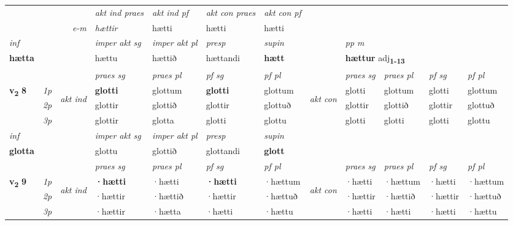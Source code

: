 \begin{longtable}[l]{X>{\footnotesize\itshape}llXXXXlXXXX}
   && &  \textit{akt ind praes} & \textit{akt ind pf} & \textit{akt con praes} & \textit{akt con pf} \\*
\multicolumn{3}{r}{\textit{e-m}} & hættir & hætti & hætti & hætti \\*

\cmidrule{4-7}
   {\textit{inf}} & &  & \textit{imper akt sg} & \textit{imper akt pl}   & \textit{presp} & \textit{supin}  && \textit{pp m} \\*
  {\textbf{hætta}} & && hættu  & hættið   & hættandi &  \textbf{hætt}  && \multicolumn{2}{l}{\textbf{hættur} adj\textbf{\textsubscript{1-13}}} \\*

\midrule

 & &   & \textit{praes sg}  & \textit{praes pl}    & \textit{ pf sg} & \textit{pf pl} & & \textit{praes sg}  & \textit{praes pl}    & \textit{pf sg} & \textit{pf pl }  \\ \cmidrule{4-7} \cmidrule{9-12}
 \multirow{2}{*}{{{\textbf{v{\textsubscript{2}}} \Large{\textbf{8}}}}}  & 1p & \multirow{3}{*}{\begin{turn}{90}\textit{akt ind}\end{turn}} & \textbf{glotti} & glottum & \textbf{glotti} & glottum & \multirow{3}{*}{\begin{turn}{90}\textit{akt con}\end{turn}} &glotti & glottum & glotti & glottum\\*
 & 2p &  &  glottir  & glottið & glottir & glottuð & & glottir & glottið & glottir & glottuð \\*
 & 3p &  & glottir & glotta & glotti & glottu & & glotti & glotti& glotti & glottu \\*
\cmidrule{4-7} \cmidrule{9-12}

   {\textit{inf}} & &  & \textit{imper akt sg} & \textit{imper akt pl}   & \textit{presp} & \textit{supin}   \\*
  {\textbf{glotta}} & && glottu  & glottið   & glottandi &  \textbf{glott}   \\*

\midrule
 
   \midrule
 & &   & \textit{praes sg}  & \textit{praes pl}    & \textit{ pf sg} & \textit{pf pl} & & \textit{praes sg}  & \textit{praes pl}    & \textit{pf sg} & \textit{pf pl }  \\ \cmidrule{4-7} \cmidrule{9-12}
 \multirow{2}{*}{{{\textbf{v{\textsubscript{2}}} \Large{\textbf{9}}}}}  & 1p & \multirow{3}{*}{\begin{turn}{90}\textit{akt ind}\end{turn}} & \textbf{·hætti} & ·hætti & \textbf{·hætti} & ·hættum & \multirow{3}{*}{\begin{turn}{90}\textit{akt con}\end{turn}} &·hætti & ·hættum & ·hætti & ·hættum\\*
 & 2p &  &  ·hættir  & ·hættið & ·hættir & ·hættuð & & ·hættir & ·hættið & ·hættir & ·hættuð \\*
 & 3p &  & ·hættir & ·hætta & ·hætti & ·hættu & & ·hætti & ·hætti& ·hætti & ·hættu \\*
\cmidrule{4-7} \cmidrule{9-12}


\end{longtable}
